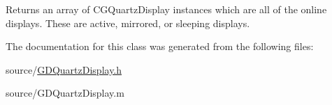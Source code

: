 Returns an array of CGQuartzDisplay instances which are all of the online displays. These are active, mirrored, or sleeping displays. 

The documentation for this class was generated from the following files:\begin{DoxyCompactItemize}
\item 
source/\hyperlink{_g_d_quartz_display_8h}{GDQuartzDisplay.h}\item 
source/GDQuartzDisplay.m\end{DoxyCompactItemize}
